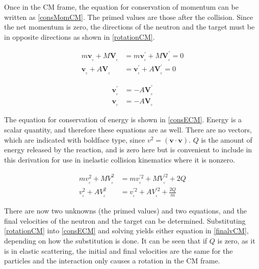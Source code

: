 Once in the CM frame, the equation for conservation of momentum can be written as \eqref{consMomCM}.  The primed values are those after the collision.  Since the net momentum is zero, the directions of the neutron and the target must be in opposite directions as shown in \eqref{rotationCM}.

\begin{equation}
\begin{split}
m \boldsymbol{v_{_\mathrm{c}}} + M \boldsymbol{V_{_\mathrm{c}}} &= m \boldsymbol{v_{_\mathrm{c}}^\prime} + M \boldsymbol{V_{_\mathrm{c}}^\prime} = 0\\
    \boldsymbol{v_{_\mathrm{c}}} + A  \boldsymbol{V_{_\mathrm{c}}} &=     \boldsymbol{v_{_\mathrm{c}}^\prime} + A  \boldsymbol{V_{_\mathrm{c}}^\prime} = 0
\end{split}
\label{consMomCM}
\end{equation}

\begin{equation}
\begin{split}
\boldsymbol{v_{_\mathrm{c}}^\prime} &= - A  \boldsymbol{V_{_\mathrm{c}}^\prime} \\
\boldsymbol{v_{_\mathrm{c}}} &= -A  \boldsymbol{V_{_\mathrm{c}}}
\end{split}
\label{rotationCM}
\end{equation}

The equation for conservation of energy is shown in \ref{consECM}.  Energy is a scalar quantity, and therefore these equations are as well.  There are no vectors, which are indicated with boldface type, since $v^2 =( \boldsymbol{v} \cdot \boldsymbol{v})$.  $Q$ is the amount of energy released by the reaction, and is zero here but is convenient to include in this derivation for use in inelastic collision kinematics where it is nonzero.

\begin{equation}
\begin{split}
m v_{_\mathrm{c}}^2 + M V_{_\mathrm{c}}^2 &= m v_{_\mathrm{c}}^{\prime2} + M V_{_\mathrm{c}}^{\prime2} + 2Q \\
    v_{_\mathrm{c}}^2 + A  V_{_\mathrm{c}}^2 &=     v_{_\mathrm{c}}^{\prime2} + A  V_{_\mathrm{c}}^{\prime2} + \frac{2Q}{m}
\end{split}
\label{consECM}
\end{equation}

There are now two unknowns (the primed values) and two equations, and the final velocities of the neutron and the target can be determined.  Substituting \eqref{rotationCM} into \eqref{consECM} and solving yields either equation in \eqref{finalvCM}, depending on how the substitution is done.  It can be seen that if $Q$ is zero, as it is in elastic scattering, the initial and final velocities are the same for the particles and the interaction only causes a rotation in the CM frame.

